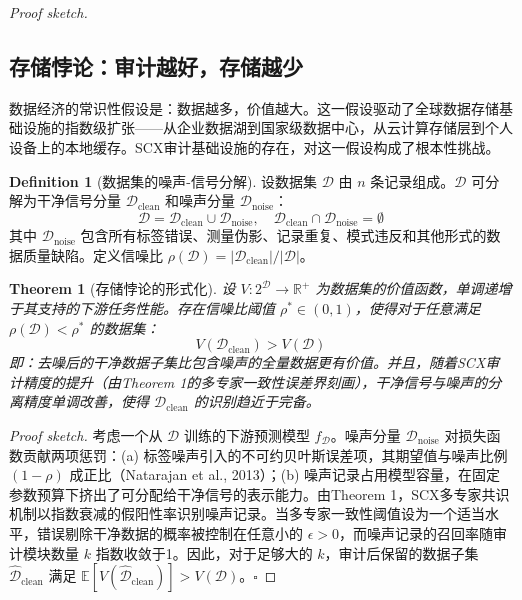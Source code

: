 \documentclass[12pt,a4paper]{ctexart}
\newtheorem{theorem}{Theorem}[section]
\theoremstyle{definition}
\newtheorem{definition}{Definition}[section]
\theoremstyle{remark}
\begin{document}
\begin{proof}[Proof sketch]
\subsection{存储悖论：审计越好，存储越少}

数据经济的常识性假设是：数据越多，价值越大。这一假设驱动了全球数据存储基础设施的指数级扩张——从企业数据湖到国家级数据中心，从云计算存储层到个人设备上的本地缓存。SCX审计基础设施的存在，对这一假设构成了根本性挑战。

\begin{definition}[数据集的噪声-信号分解]
设数据集 $\mathcal{D}$ 由 $n$ 条记录组成。$\mathcal{D}$ 可分解为干净信号分量 $\mathcal{D}_{\text{clean}}$ 和噪声分量 $\mathcal{D}_{\text{noise}}$：
\begin{equation}
\mathcal{D} = \mathcal{D}_{\text{clean}} \cup \mathcal{D}_{\text{noise}}, \quad \mathcal{D}_{\text{clean}} \cap \mathcal{D}_{\text{noise}} = \emptyset
\end{equation}
其中 $\mathcal{D}_{\text{noise}}$ 包含所有标签错误、测量伪影、记录重复、模式违反和其他形式的数据质量缺陷。定义信噪比 $\rho(\mathcal{D}) = |\mathcal{D}_{\text{clean}}| / |\mathcal{D}|$。
\end{definition}

\begin{theorem}[存储悖论的形式化]
\label{thm:storage-paradox}
设 $V: 2^{\mathcal{D}} \to \mathbb{R}^+$ 为数据集的价值函数，单调递增于其支持的下游任务性能。存在信噪比阈值 $\rho^* \in (0, 1)$，使得对于任意满足 $\rho(\mathcal{D}) < \rho^*$ 的数据集：
\begin{equation}
V(\mathcal{D}_{\text{clean}}) > V(\mathcal{D})
\end{equation}
即：去噪后的干净数据子集比包含噪声的全量数据更有价值。并且，随着SCX审计精度的提升（由Theorem 1的多专家一致性误差界刻画），干净信号与噪声的分离精度单调改善，使得 $\mathcal{D}_{\text{clean}}$ 的识别趋近于完备。
\end{theorem}

\textit{Proof sketch.} 考虑一个从 $\mathcal{D}$ 训练的下游预测模型 $f_{\mathcal{D}}$。噪声分量 $\mathcal{D}_{\text{noise}}$ 对损失函数贡献两项惩罚：(a) 标签噪声引入的不可约贝叶斯误差项，其期望值与噪声比例 $(1-\rho)$ 成正比（Natarajan et al., 2013）；(b) 噪声记录占用模型容量，在固定参数预算下挤出了可分配给干净信号的表示能力。由Theorem 1，SCX多专家共识机制以指数衰减的假阳性率识别噪声记录。当多专家一致性阈值设为一个适当水平，错误剔除干净数据的概率被控制在任意小的 $\epsilon > 0$，而噪声记录的召回率随审计模块数量 $k$ 指数收敛于1。因此，对于足够大的 $k$，审计后保留的数据子集 $\hat{\mathcal{D}}_{\text{clean}}$ 满足 $\mathbb{E}[V(\hat{\mathcal{D}}_{\text{clean}})] > V(\mathcal{D})$。\hfill $\square$


\end{proof}
\end{document}
